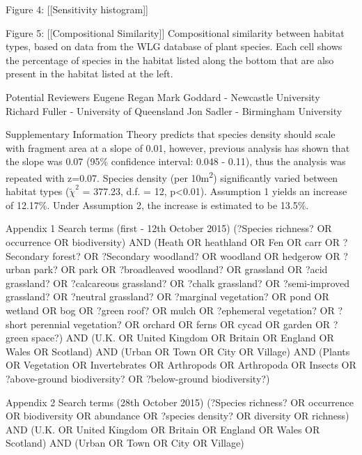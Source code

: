 Figure 4: [[Sensitivity histogram]]

Figure 5: [[Compositional Similarity]]
Compositional similarity between habitat types, based on data from the WLG database of plant species. Each cell shows the percentage of species in the habitat listed along the bottom that are also present in the habitat listed at the left.

Potential Reviewers
Eugene Regan
Mark Goddard - Newcastle University
Richard Fuller - University of Queensland
Jon Sadler - Birmingham University

Supplementary Information
Theory predicts that species density should scale with fragment area at a slope of 0.01, however, previous analysis has shown that the slope was 0.07 (95\% confidence interval: 0.048 - 0.11), thus the analysis was repeated with z=0.07.  Species density (per 10m\textsuperscript{2}) significantly varied between habitat types ($\tilde{\chi}^2$ = 377.23, d.f. = 12, p<0.01).  Assumption 1 yields an increase of 12.17\%. Under Assumption 2, the increase is estimated to be 13.5\%.


Appendix 1
Search terms (first - 12th October 2015)
(?Species richness? OR occurrence OR biodiversity) AND (Heath OR heathland OR Fen OR carr OR ?Secondary forest? OR ?Secondary woodland? OR woodland OR hedgerow OR ?urban park? OR park OR ?broadleaved woodland? OR grassland OR ?acid grassland? OR ?calcareous grassland? OR ?chalk grassland? OR ?semi-improved grassland? OR ?neutral grassland? OR ?marginal vegetation? OR pond OR wetland OR bog OR ?green roof? OR mulch OR ?ephemeral vegetation? OR ?short perennial vegetation? OR orchard OR ferns OR cycad OR garden OR ?green space?) AND (U.K. OR United Kingdom OR Britain OR England OR Wales OR Scotland) AND (Urban OR Town OR City OR Village) AND (Plants OR Vegetation OR Invertebrates OR Arthropods OR Arthropoda OR Insects OR ?above-ground biodiversity? OR ?below-ground biodiversity?)

Appendix 2
Search terms (28th October 2015)
(?Species richness? OR occurrence OR biodiversity OR abundance OR ?species density? OR diversity OR richness) AND (U.K. OR United Kingdom OR Britain OR England OR Wales OR Scotland) AND (Urban OR Town OR City OR Village)

